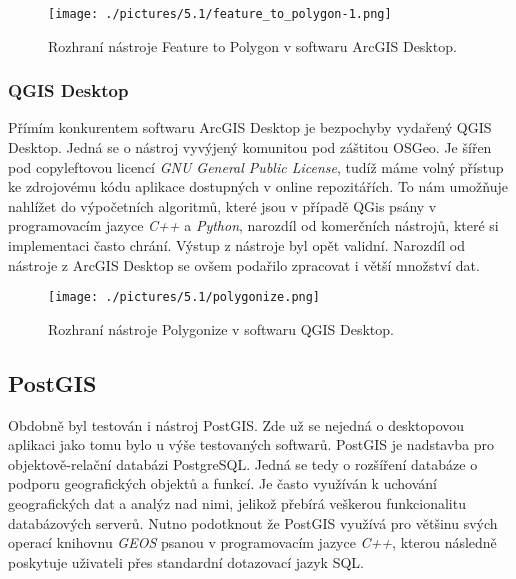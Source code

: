 \begin{figure}[h]
  \centering
  \texttt{[image: ./pictures/5.1/feature\_to\_polygon-1.png]}
  \caption{Rozhraní nástroje Feature to Polygon v softwaru ArcGIS Desktop.}
  \label{fig:feature_to_polygon-1}
\end{figure}


\subsubsection{QGIS Desktop}
	Přímím konkurentem softwaru ArcGIS Desktop je bezpochyby vydařený QGIS Desktop. Jedná se o nástroj vyvýjený komunitou pod záštitou OSGeo. Je šířen pod copyleftovou  licencí \textit{GNU General Public License}, tudíž máme volný přístup ke zdrojovému kódu aplikace dostupných v online repozitářích. To nám umožňuje nahlížet do výpočetních algoritmů, které jsou v případě QGis psány v programovacím jazyce \textit{C++} a \textit{Python}, narozdíl od komerčních nástrojů, které si implementaci často chrání. Výstup z nástroje byl opět validní. Narozdíl od nástroje z ArcGIS Desktop se ovšem podařilo zpracovat i větší množství dat.

\begin{figure}[h]
  \centering
  \texttt{[image: ./pictures/5.1/polygonize.png]}
  \caption{Rozhraní nástroje Polygonize v softwaru QGIS Desktop.}
  \label{fig:polygonize}
\end{figure}

\subsection{PostGIS}
	Obdobně byl testován i nástroj PostGIS. Zde už se nejedná o desktopovou aplikaci jako tomu bylo u výše testovaných softwarů. PostGIS je nadstavba pro objektově-relační databázi PostgreSQL. Jedná se tedy o rozšíření databáze o podporu geografických objektů a funkcí. Je často využíván k uchování geografických dat a analýz nad nimi, jelikož přebírá veškerou funkcionalitu databázových serverů. Nutno podotknout že PostGIS využívá pro většinu svých operací knihovnu \textit{GEOS} psanou v programovacím jazyce \textit{C++}, kterou následně poskytuje uživateli přes standardní dotazovací jazyk SQL.
